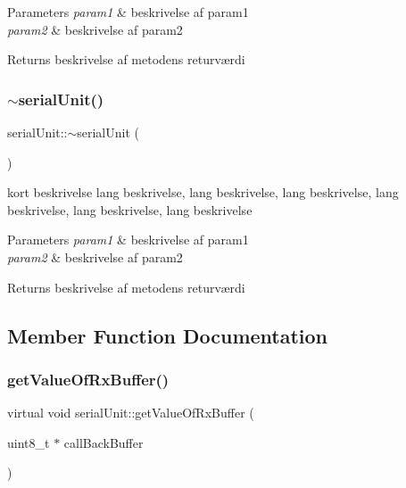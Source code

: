 \begin{DoxyParams}{Parameters}
{\em param1} & beskrivelse af param1 \\
\hline
{\em param2} & beskrivelse af param2 \\
\hline
\end{DoxyParams}
\begin{DoxyReturn}{Returns}
beskrivelse af metodens returværdi 
\end{DoxyReturn}
\mbox{\label{classserialUnit_a1e6211e2fe4b241d3f2e2dc116435b7d}} 
\subsubsection{\texorpdfstring{$\sim$serial\+Unit()}{~serialUnit()}}
{\footnotesize\ttfamily serial\+Unit\+::$\sim$serial\+Unit (\begin{DoxyParamCaption}{ }\end{DoxyParamCaption})\hspace{0.3cm}{\ttfamily [pure virtual]}}



kort beskrivelse lang beskrivelse, lang beskrivelse, lang beskrivelse, lang beskrivelse, lang beskrivelse, lang beskrivelse 


\begin{DoxyParams}{Parameters}
{\em param1} & beskrivelse af param1 \\
\hline
{\em param2} & beskrivelse af param2 \\
\hline
\end{DoxyParams}
\begin{DoxyReturn}{Returns}
beskrivelse af metodens returværdi 
\end{DoxyReturn}


\subsection{Member Function Documentation}
\mbox{\label{classserialUnit_a88db4b94632c6ab70933bb32f105821d}} 
\subsubsection{\texorpdfstring{get\+Value\+Of\+Rx\+Buffer()}{getValueOfRxBuffer()}}
{\footnotesize\ttfamily virtual void serial\+Unit\+::get\+Value\+Of\+Rx\+Buffer (\begin{DoxyParamCaption}\item[{uint8\+\_\+t $\ast$}]{call\+Back\+Buffer }\end{DoxyParamCaption})\hspace{0.3cm}{\ttfamily [pure virtual]}}



